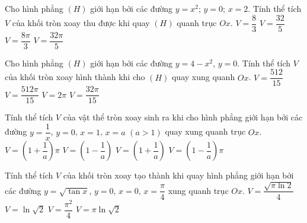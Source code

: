 	\begin{ex}%
		Cho hình phẳng $(H)$ giới hạn bởi các đường $y=x^2$; $y=0$; $x=2$. Tính thể tích $V$ của khối tròn xoay thu được khi quay $(H)$ quanh trục $Ox$. 
		\choice
		{$V=\dfrac{8}{3}$}
		{$V=\dfrac{32}{5}$}
		{$V=\dfrac{8\pi}{3}$}
		{\True $V=\dfrac{32\pi}{5}$}
	\end{ex}

	\begin{ex}%
		Cho hình phẳng $(H)$ giới hạn bởi các đường $y=4-x^2$, $y=0$. Tính thể tích $V$ của khối tròn xoay hình thành khi cho $(H)$ quay xung quanh $Ox$.
		\choice
		{$V=\dfrac{512}{15}$}
		{\True $V=\dfrac{512\pi}{15}$}
		{$V=2\pi$}
		{$V=\dfrac{32\pi}{15}$}
	\end{ex}

	\begin{ex}%
		Tính thể tích $V$ của vật thể tròn xoay sinh ra khi cho hình phẳng giới hạn bởi các đường $y=\dfrac{1}{x}$, $y=0$, $x=1$, $x=a$ $(a>1)$ quay xung quanh trục $Ox$.
		\choice
		{$V=\left(1+\dfrac{1}{a}\right)\pi$}
		{$V=\left(1-\dfrac{1}{a}\right)$}
		{$V=\left(1+\dfrac{1}{a}\right)$}
		{\True $V=\left(1-\dfrac{1}{a}\right)\pi$}
	\end{ex}

	\begin{ex}%
		Tính thể tích $V$ của khối tròn xoay tạo thành khi quay hình phẳng giới hạn bởi các đường $y=\sqrt{\tan x}$, $y=0$, $x=0$, $x=\dfrac{\pi}{4}$ xung quanh trục $Ox$. 
		\choice
		{$V=\dfrac{\sqrt{\pi\ln 2}}{4}$}
		{$V=\ln\sqrt{2}$}
		{$V=\dfrac{{\pi}^2}{4}$}
		{\True $V=\pi\ln\sqrt{2}$}
	\end{ex}


